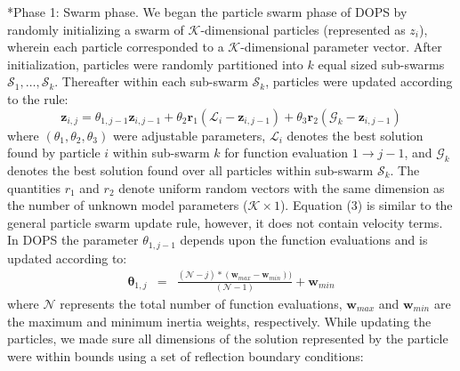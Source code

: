 \documentclass[12pt]{article}
\makeatletter
\renewcommand\subsubsection{\@startsection
	{subsubsection}{2}{0mm}
	{-0.05in}
	{-0.5\baselineskip}
	{\normalfont\normalsize\itshape}}
\makeatother
\begin{document}
\subsubsection*{Phase 1: Swarm phase.}
We began the particle swarm phase of DOPS by randomly initializing a swarm of $\mathcal{K}$-dimensional particles (represented as $z_{i}$),
wherein each particle corresponded to a $\mathcal{K}$-dimensional parameter vector.
After initialization, particles were randomly partitioned into $k$ equal sized sub-swarms $\mathcal{S}_{1},\hdots,\mathcal{S}_{k}$.
Thereafter within each sub-swarm $\mathcal{S}_{k}$, particles were updated according to the rule:
\begin{equation}\label{eqn:update-rule}
	\mathbf{z}_{i,j} = \theta_{1,j-1}\mathbf{z}_{i,j-1} + \theta_{2}\mathbf{r}_{1}\left(\mathcal{L}_{i} - \mathbf{z}_{i,j-1}\right) + \theta_{3}\mathbf{r}_{2}\left(\mathcal{G}_{k} - \mathbf{z}_{i,j-1}\right)
\end{equation}
where $\left(\theta_{1},\theta_{2},\theta_{3}\right)$ were adjustable parameters, $\mathcal{L}_{i}$ denotes the best solution found by particle $i$ within sub-swarm $k$ for function evaluation $1\rightarrow j-1$, and
$\mathcal{G}_{k}$ denotes the best solution found over all particles within sub-swarm $\mathcal{S}_{k}$.
The quantities $r_{1}$ and $r_{2}$ denote uniform random vectors with the same dimension as the number of unknown model parameters ($\mathcal{K}\times{1}$).
Equation (3) is similar to the general particle swarm update rule, however, it does not contain velocity terms.
In DOPS the parameter $\theta_{1,j-1}$ depends upon the function evaluations and is updated according to:
\begin{eqnarray}
	\mathbf \theta_{1,j}&=&\frac{(\mathcal{N}-{j})*(\mathbf{w}_{max}-\mathbf{w}_{min}))}{(\mathcal{N}-{1})} + \mathbf{w}_{min}
\end{eqnarray}
where $\mathcal{N}$ represents the total number of function evaluations, $\mathbf{w}_{max}$ and $\mathbf{w}_{min}$ are the maximum and minimum inertia weights, respectively.
While updating the particles, we made sure all dimensions of the solution represented by the particle were within bounds using a set of reflection boundary conditions:

\begin{eqnarray*}
\end{eqnarray*}

\begin{algorithm}
\end{algorithm}
\end{document}
